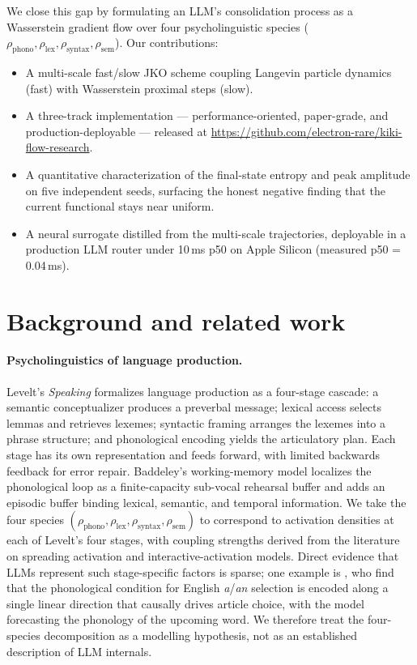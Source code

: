 \documentclass[11pt]{article}
\begin{document}
We close this gap by formulating an LLM's consolidation process as a
Wasserstein gradient flow over four psycholinguistic species
($\rho_{\text{phono}}, \rho_{\text{lex}}, \rho_{\text{syntax}},
\rho_{\text{sem}}$). Our contributions:
\begin{itemize}
  \item A multi-scale fast/slow JKO scheme coupling Langevin particle
        dynamics (fast) with Wasserstein proximal steps (slow).
  \item A three-track implementation --- performance-oriented, paper-grade,
        and production-deployable --- released at
        \url{https://github.com/electron-rare/kiki-flow-research}.
  \item A quantitative characterization of the final-state entropy and
        peak amplitude on five independent seeds, surfacing the honest
        negative finding that the current functional stays near uniform.
  \item A neural surrogate distilled from the multi-scale trajectories,
        deployable in a production LLM router under 10\,ms p50 on
        Apple Silicon (measured p50 = 0.04\,ms).
\end{itemize}

\section{Background and related work}
\label{sec:related}

\paragraph{Psycholinguistics of language production.}
Levelt's \emph{Speaking} \cite{levelt1989speaking} formalizes language
production as a four-stage cascade: a semantic conceptualizer produces a
preverbal message; lexical access selects lemmas and retrieves lexemes;
syntactic framing arranges the lexemes into a phrase structure; and
phonological encoding yields the articulatory plan. Each stage has its
own representation and feeds forward, with limited backwards feedback
for error repair. Baddeley's working-memory model
\cite{baddeley2000episodic} localizes the phonological loop as a
finite-capacity sub-vocal rehearsal buffer and adds an episodic buffer
binding lexical, semantic, and temporal information. We take the four
species $(\rho_{\text{phono}}, \rho_{\text{lex}}, \rho_{\text{syntax}},
\rho_{\text{sem}})$ to correspond to activation densities at each of
Levelt's four stages, with coupling strengths derived from the literature
on spreading activation and interactive-activation models. Direct
evidence that LLMs represent such stage-specific factors is sparse; one
example is \cite{kim2026allomorph}, who find that the phonological
condition for English \emph{a}/\emph{an} selection is encoded along a
single linear direction that causally drives article choice, with the
model forecasting the phonology of the upcoming word. We therefore treat
the four-species decomposition as a modelling hypothesis, not as an
established description of LLM internals.
\end{document}
